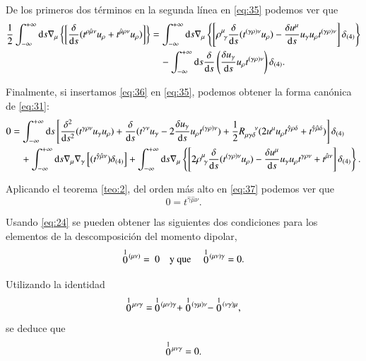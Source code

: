 De los primeros dos términos en la segunda línea en \eqref{eq:35} podemos ver que
\begin{align}
\nonumber
\frac{1}{2} \int_{-\infty}^{+\infty} \mathrm{d}s \nabla_{\mu} \left\{ \left[ \frac{\delta }{\mathrm{d}s}( t^{\rho \hat{\mu} \nu} u_{\rho} + t^{\hat{\mu} \rho \nu} u_{\rho}) \right] \right\} &= 
\int_{-\infty}^{+\infty} \mathrm{d}s \nabla_{\mu} \left\{ \left[ \rho^{\mu}_{\ \gamma} \frac{\delta }{\mathrm{d}s}( t^{(\gamma \rho) \nu} u_{\rho} ) - \frac{\delta u^{\mu}}{\mathrm{d}s} u_{\gamma} u_{\rho} t^{(\gamma \rho) \nu} \right] \delta_{(4)} \right\} \\ 
\label{eq:36}
& \quad - \int_{-\infty}^{+\infty} \mathrm{d}s \frac{\delta }{\mathrm{d}s} \left( \frac{\delta u_{\gamma}}{\mathrm{d}s} u_{\rho} t^{(\gamma \rho) \nu} \right) \delta_{(4)}.
\end{align}

Finalmente, si insertamos \eqref{eq:36} en \eqref{eq:35}, podemos obtener la forma canónica de \eqref{eq:31}:
\begin{align}
\nonumber
0 &= \int_{-\infty}^{+\infty} \mathrm{d}s \left[ \frac{\delta^2}{\mathrm{d}s^2} (t^{\gamma \rho \nu} u_{\gamma}u_{\rho}) + \frac{\delta }{\mathrm{d}s} (t^{\gamma \nu} u_{\gamma} - 2\frac{\delta u_{\gamma}}{\mathrm{d}s} u_{\rho} t^{(\gamma \rho) \nu}) + \frac{1}{2} R^{\ \ \ \ \nu}_{\mu \gamma \delta} (2 u^{\mu} u_{\rho} t^{\hat{\gamma} \rho \delta} + t^{\hat{\gamma} \hat{\mu} \delta}) \right] \delta_{(4)} \\ 
\label{eq:37}
& \quad + \int_{-\infty}^{+\infty} \mathrm{d}s \nabla_{\mu} \nabla_{\gamma} \left[ ( t^{\hat{\gamma} \hat{\mu} \nu} )\delta_{(4)} \right] + \int_{-\infty}^{+\infty} \mathrm{d}s \nabla_{\mu} \left\{ \left[ 2 \rho^{\mu}_{\ \gamma} \frac{\delta }{\mathrm{d}s}( t^{(\gamma \rho) \nu} u_{\rho} ) - \frac{\delta u^{\mu}}{\mathrm{d}s} u_{\gamma} u_{\rho} t^{\gamma \rho \nu} + t^{\hat{\mu} \nu} \right] \delta_{(4)} \right\}.
\end{align}

Aplicando el teorema \ref{teo:2}, del orden más alto en \eqref{eq:37} podemos ver que
\begin{equation}
0 =  t^{\hat{\gamma} \hat{\mu} \nu}.
\end{equation}

Usando \eqref{eq:24} se pueden obtener las siguientes dos condiciones para los elementos de la descomposición del momento dipolar,
\begin{equation}
\label{eq:38}
\stackrel{1}{0}{\!}^{(\mu \nu)} = \ 0 \quad \mathrm{y \ que} \quad \stackrel{1}{0}{\!}^{(\mu \nu) \gamma} = 0.
\end{equation}

Utilizando la identidad
\begin{equation}
\stackrel{1}{0}{\!}^{\mu \nu \gamma} = \ \stackrel{1}{0}{\!}^{(\mu \nu) \gamma} + \stackrel{1}{0}{\!}^{(\gamma \mu) \nu} - \stackrel{1}{0}{\!}^{(\nu \gamma) \mu},
\end{equation}
se deduce que
\begin{equation}
\label{eq:39}
\stackrel{1}{0}{\!}^{\mu \nu \gamma} = 0.
\end{equation}

